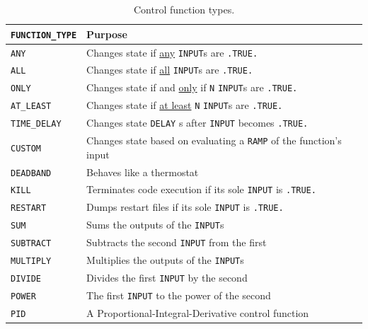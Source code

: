 \documentclass[11pt]{book}
\newcommand{\ct}{\tt\small}
\begin{document}
\begin{table}[h!]
\caption[Control function types]{Control function types.}
\label{tab:funcvalues}
\begin{center}
\begin{tabular}{|l||l|}
\hline
{\ct FUNCTION\_TYPE}              & Purpose   \\ \hline \hline
{\ct ANY}                         & Changes state if \underline{any} {\ct INPUT}s are {\ct .TRUE.}  \\ \hline
{\ct ALL}                         & Changes state if \underline{all} {\ct INPUT}s are {\ct .TRUE.}  \\ \hline
{\ct ONLY}                        & Changes state if and \underline{only} if {\ct N} {\ct INPUT}s are {\ct .TRUE.}  \\ \hline
{\ct AT\_LEAST}                   & Changes state if \underline{at least} {\ct N} {\ct INPUT}s are {\ct .TRUE.}  \\ \hline
{\ct TIME\_DELAY}                 & Changes state {\ct DELAY} s after {\ct INPUT} becomes {\ct .TRUE.} \\ \hline
{\ct CUSTOM}                      & Changes state based on evaluating a {\ct RAMP} of the function's input \\ \hline
{\ct DEADBAND}                    & Behaves like a thermostat  \\ \hline
{\ct KILL}                        & Terminates code execution if its sole {\ct INPUT} is {\ct .TRUE.}  \\ \hline
{\ct RESTART}                     & Dumps restart files if its sole {\ct INPUT} is {\ct .TRUE.} \\ \hline
{\ct SUM}                         & Sums the outputs of the {\ct INPUT}s \\ \hline
{\ct SUBTRACT}                    & Subtracts the second {\ct INPUT} from the first \\ \hline
{\ct MULTIPLY}                    & Multiplies the outputs of the {\ct INPUT}s \\ \hline
{\ct DIVIDE}                      & Divides the first {\ct INPUT} by the second \\ \hline
{\ct POWER}                       & The first {\ct INPUT} to the power of the second \\ \hline
{\ct PID}                         & A Proportional-Integral-Derivative control function \\ \hline
\end{tabular}
\end{center}
\end{table}
\end{document}
